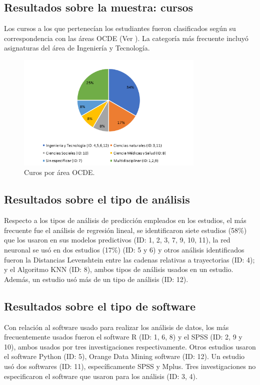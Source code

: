 \documentclass[spanish]{textolivre}
\begin{document}
\subsection*{Resultados sobre la muestra: cursos}
Los cursos a los que pertenecían los estudiantes fueron clasificados según su correspondencia con las áreas OCDE (Ver ). La categoría más frecuente incluyó asignaturas del área de Ingeniería y Tecnología.

\begin{figure}[htbp]
 \centering
 \includegraphics[width=0.8\textwidth]{36310-fig4.png}
 \caption{Curos por área OCDE.}
 \label{fig4}
\end{figure}

\subsection*{Resultados sobre el tipo de análisis}
Respecto a los tipos de análisis de predicción empleados en los estudios, el más frecuente fue el análisis de regresión lineal, se identificaron siete estudios (58\%) que los usaron en sus modelos predictivos (ID: 1, 2, 3, 7, 9, 10, 11), la red neuronal se usó en dos estudios (17\%) (ID: 5 y 6) y otros análisis identificados fueron la Distancias Levenshtein entre las cadenas relativas a trayectorias (ID: 4); y el Algoritmo KNN (ID: 8), ambos tipos de análisis usados en un estudio. Además, un estudio usó más de un tipo de análisis (ID: 12).

\subsection*{Resultados sobre el tipo de software}
Con relación al software usado para realizar los análisis de datos, los más frecuentemente usados fueron el software R (ID: 1, 6, 8) y el SPSS (ID: 2, 9 y 10), ambos usados por tres investigaciones respectivamente. Otros estudios usaron el software Python (ID: 5), Orange Data Mining software (ID: 12). Un estudio usó dos softwares (ID: 11), específicamente SPSS y Mplus. Tres investigaciones no especificaron el software que usaron para los análisis (ID: 3, 4).
\end{document}
